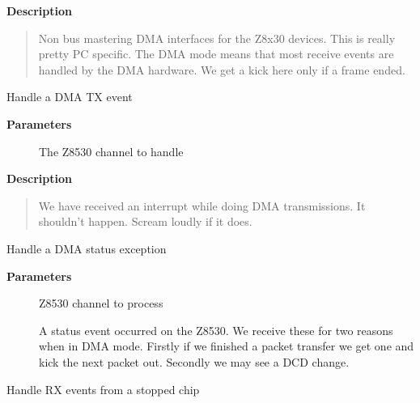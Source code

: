 \documentclass[a4paper,8pt,english]{sphinxmanual}
\begin{document}
\textbf{Description}
\begin{quote}

Non bus mastering DMA interfaces for the Z8x30 devices. This
is really pretty PC specific. The DMA mode means that most receive
events are handled by the DMA hardware. We get a kick here only if
a frame ended.
\end{quote}

\begin{fulllineitems}
\label{networking/z8530book:c.z8530_dma_tx}
Handle a DMA TX event

\end{fulllineitems}


\textbf{Parameters}
\begin{description}
\item[{}] \leavevmode
The Z8530 channel to handle

\end{description}

\textbf{Description}
\begin{quote}

We have received an interrupt while doing DMA transmissions. It
shouldn't happen. Scream loudly if it does.
\end{quote}

\begin{fulllineitems}
\label{networking/z8530book:c.z8530_dma_status}
Handle a DMA status exception

\end{fulllineitems}


\textbf{Parameters}
\begin{description}
\item[{}] \leavevmode
Z8530 channel to process

A status event occurred on the Z8530. We receive these for two reasons
when in DMA mode. Firstly if we finished a packet transfer we get one
and kick the next packet out. Secondly we may see a DCD change.

\end{description}

\begin{fulllineitems}
\label{networking/z8530book:c.z8530_rx_clear}
Handle RX events from a stopped chip

\end{fulllineitems}
\end{document}
